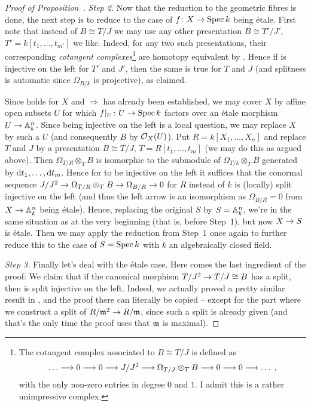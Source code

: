 \documentclass[a4paper,parskip=half,numbers=enddot, DIV=12]{scrreprt}
\begin{document}
\begin{proof}[Proof of Proposition~]
	 \emph{Step 2.} Now that the reduction to the geometric fibres is done, the next step is to reduce to the case of $f\colon X\morphism \Spec k$ being étale. First note that instead of $B\cong T/J$ we may use any other presentation $B\cong T'/J'$, $T'=k[t_1,\ldots,t_{m'}]$ we like. Indeed, for any two such presentations, their corresponding \emph{cotangent complexes}\footnote{The cotangent complex associated to $B\cong T/J$ is defined as
	 \begin{align*}
	 	\ldots \morphism 0\morphism 0\morphism J/J^2\morphism \Omega_{T/J}\otimes_TB\morphism 0\morphism 0\morphism\ldots\;,
 	\end{align*}
	with the only non-zero entries in degree $0$ and $1$. I admit this is a rather unimpressive complex.} are homotopy equivalent by \cite[]{stacks-project}. Hence if  is injective on the left for $T'$ and $J'$, then the same is true for $T$ and $J$ (and splitness is automatic since $\Omega_{B/k}$ is projective), as claimed.

	Since  holds for $X$ and  $\Rightarrow$  has already been established, we may cover $X$ by affine open subsets $U$ for which $f|_U\colon U\morphism\Spec k$ factors over an étale morphism $U\morphism\IA_k^n$. Since  being injective on the left is a local question, we may replace $X$ by such a $U$ (and consequently $B$ by $\mathcal{O}_X(U)$). Put $R=k[X_1,\ldots,X_n]$ and replace $T$ and $J$ by a presentation $B\cong T/J$, $T=R[t_1,\ldots,t_m]$ (we may do this as argued above). Then $\Omega_{T/R}\otimes_TB$ is isomorphic to the submodule of $\Omega_{T/k}\otimes_TB$ generated by $\mathop{}\!\mathrm{d} t_1,\ldots,\mathop{}\!\mathrm{d} t_m$. Hence for  to be injective on the left it suffices that the conormal sequence $J/J^2\morphism\Omega_{T/R}\otimes_TB\morphism\Omega_{B/R}\morphism 0$ for $R$ instead of $k$ is (locally) split injective on the left (and thus the left arrow is an isomorphism as $\Omega_{B/R}=0$ from $X\morphism \IA_k^n$ being étale). Hence, replacing the original $S$ by $S=\mathbb{A}_k^n$, we're in the same situation as at the very beginning (that is, before Step~1), but now $X\morphism S$ is étale. Then we may apply the reduction from Step~1 once again to further reduce this to the case of $S=\operatorname{Spec} k$ with $k$ an algebraically closed field.
	
	\emph{Step 3.} Finally let's deal with the étale case. Here comes the last ingredient of the proof: We claim that if the canonical morphism $T/J^2\morphism T/J\cong B$ has a split, then  is split injective on the left. Indeed, we actually proved a pretty similar result in \cite[Lemma~1.6.1]{alg2}, and the proof there can literally be copied -- except for the part where we construct a split of $R/\mm^2\morphism R/\mm$, since such a split is already given (and that's the only time the proof uses that $\mathfrak{m}$ is maximal).
	

\end{proof}
\end{document}
